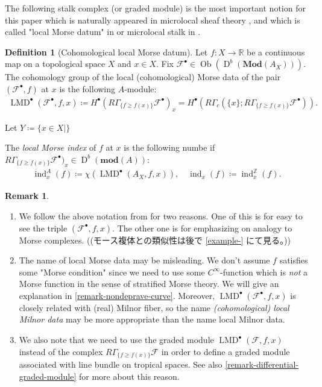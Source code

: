 \documentclass[a4paper,dvipdfmx,reqno,12pt]{amsart}
\theoremstyle{definition}
\newtheorem{definition}[theorem]{Definition}
\newtheorem{remark}[theorem]{Remark}
\newcommand{\deq}{\coloneqq}
\newcommand{\mcal}[1]{\mathcal{#1}}%
\newcommand{\opn}[1]{\operatorname{#1}}
\newcommand{\catn}[1]{\mathbf{#1}}
\numberwithin{equation}{section}
\begin{document}
The following stalk complex (or graded module) is 
the most important notion
for this paper which is naturally appeared in
microlocal sheaf theory \cite{MR1299726}, 
and which is called "local Morse datum" in \cite[p.271]{MR2031639} 
or microlocal stalk in \cite{MR4132582}.
\begin{definition}[{Cohomological local Morse datum}]
\label{definition-local-morse-data}
Let $f\colon X\to {\mathbb{R}}$ be a continuous map on a 
topological space $X$ and $x\in X$. Fix 
$\mathcal{F}^{\bullet}\in 
\opn{Ob}(\opn{D}^{b}(\catn{Mod}(A_X)))$.
The cohomology group of the local (cohomological) Morse 
data of the pair $(\mathcal{F}^{\bullet},f)$ at $x$ 
is the following $A$-module: 
\begin{align}
\opn{LMD}^{\bullet}(\mcal{F}^{\bullet},f,x)\deq 
H^{\bullet}(R\Gamma_{\{f\geq f(x)\}}\mathcal{F}^{\bullet})_x
=H^{\bullet}(R\Gamma_c(\{x\};R\Gamma_{\{f\geq f(x)\}}
\mathcal{F}^{\bullet})).
\end{align}

Let $Y\deq \{x\in X\mid \}$


The \emph{local Morse index} of $f$ at $x$ is the 
following numbe if 
$R\Gamma_{\{f\geq f(x)\}}\mathcal{F}^{\bullet})_x
\in \opn{D}^{b}(\catn{mod}(A))$:
\begin{align} \label{equation-local-index}
\opn{ind}_x^{A}(f)\deq \chi(\opn{LMD}^{\bullet}(A_X,f,x)), \quad
\opn{ind}_x(f) \deq \opn{ind}_x^{\mathbb{Z}}(f).
\end{align}

\end{definition}

\begin{remark}
\begin{enumerate}
\item We follow the above notation from 
\cite[p.271]{MR2031639} for two reasons.
One of this is for easy to see the triple 
$(\mcal{F}^{\bullet},f,x)$. 
The other one is for emphasizing on analogy to
Morse complexes.
((モース複体との類似性は後で \cref{example-} にて見る。))
\item The name of local Morse data may be misleading.
We don't assume $f$ satisfies some 
"Morse condition" since
 we need to use some $C^{\infty}$-function
which is \emph{not} a Morse function in the sense of 
stratified Morse theory. 
We will give an explanation in 
\cref{remark-nondeprave-curve}.
Moreover, 
$\opn{LMD}^{\bullet}(\mathcal{F}^{\bullet},f,x)$
is closely related with (real) Milnor fiber, so
the name \emph{(cohomological) local Milnor data} may 
be more appropriate 
than the name local Milnor data. 
\item We also note that we need to use 
the graded module $\opn{LMD}^{\bullet}(\mcal{F},f,x)$ instead of 
the complex $R\Gamma_{\{f\geq f(x)\}}\mathcal{F}$ in order to define
a graded module associated with line bundle on tropical
spaces. See also \cref{remark-differential-graded-module} for more about 
this reason.
\end{enumerate}
\end{remark}
\end{document}
